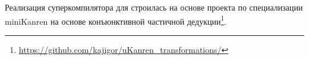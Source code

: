 Реализация суперкомпилятора для \ukanren строилась на основе проекта
по специализации miniKanren на основе конъюнктивной частичной
дедукции\footnote{\url{https://github.com/kajigor/uKanren_transformations/}}.
